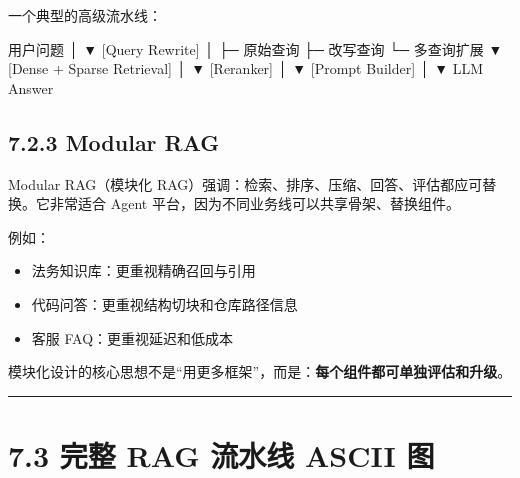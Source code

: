 一个典型的高级流水线：


\begin{codeblock}
用户问题
   │
   ▼
[Query Rewrite]
   │
   ├─ 原始查询
   ├─ 改写查询
   └─ 多查询扩展
   ▼
[Dense + Sparse Retrieval]
   │
   ▼
[Reranker]
   │
   ▼
[Prompt Builder]
   │
   ▼
LLM Answer
\end{codeblock}

\subsection{7.2.3 Modular RAG}

Modular RAG（模块化 RAG）强调：检索、排序、压缩、回答、评估都应可替换。它非常适合 Agent 平台，因为不同业务线可以共享骨架、替换组件。


例如：


\begin{itemize}[leftmargin=2em]
\item 法务知识库：更重视精确召回与引用
\item 代码问答：更重视结构切块和仓库路径信息
\item 客服 FAQ：更重视延迟和低成本
\end{itemize}

模块化设计的核心思想不是``用更多框架''，而是：\textbf{每个组件都可单独评估和升级}。


\bigskip\hrule\bigskip

\section{7.3 完整 RAG 流水线 ASCII 图}

